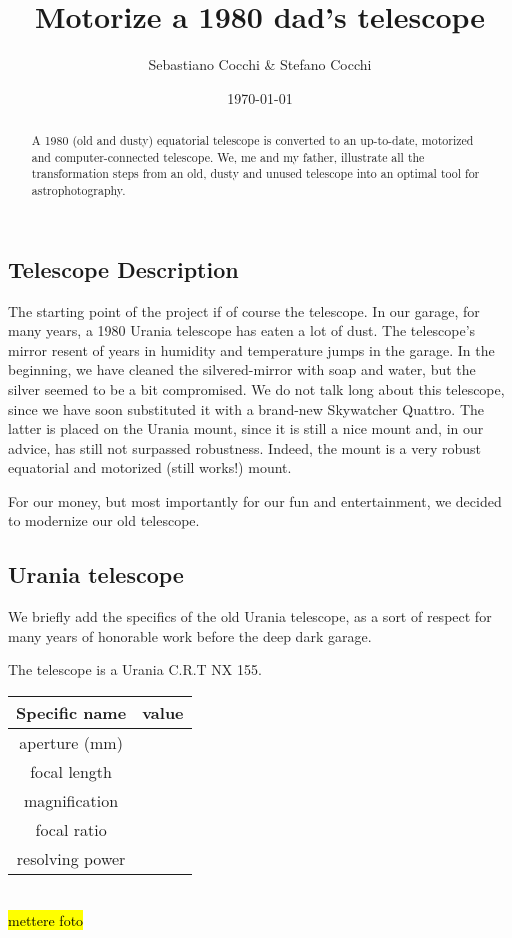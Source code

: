 \documentclass{article}
\title{Motorize a 1980 dad's telescope}
\author{Sebastiano Cocchi \& Stefano Cocchi}
\date{\today}
\begin{document}
    
    \maketitle

    \begin{abstract}
        A 1980 (old and dusty) equatorial telescope is converted to an up-to-date, motorized and computer-connected telescope.
        We, me and my father, illustrate all the transformation steps from an old, dusty and unused telescope into an optimal tool for astrophotography.
    \end{abstract}

    \tableofcontents

    \begin{multicols}{2}
        \section{Telescope Description}
        The starting point of the project if of course the telescope.
        In our garage, for many years, a 1980 Urania telescope has eaten a lot of dust.
        The telescope's mirror resent of years in humidity and temperature jumps in the garage.
        In the beginning, we have cleaned the silvered-mirror with soap and water, but the silver seemed to be a bit compromised.
        We do not talk long about this telescope, since we have soon substituted it with a brand-new Skywatcher Quattro.
        The latter is placed on the Urania mount, since it is still a nice mount and, in our advice, has still not surpassed robustness.
        Indeed, the mount is a very robust equatorial and motorized (still works!) mount.
        
        For our money, but most importantly for our fun and entertainment, we decided to modernize our old telescope.

        \subsection{Urania telescope}
        We briefly add the specifics of the old Urania telescope, as a sort of respect for many years of honorable work before the deep dark garage.

        The telescope is a Urania C.R.T NX 155.
        \\
        \begin{minipage}{0.5\textwidth}
            \centering
            \begin{tabular}{c|c}
                Specific name & value \\
                \hline
                aperture (mm) & \\
                focal length & \\
                magnification & \\
                focal ratio & \\
                resolving power & 
            \end{tabular}
        \end{minipage}
        \\
        \hl{mettere foto}


\end{multicols}
\end{document}
